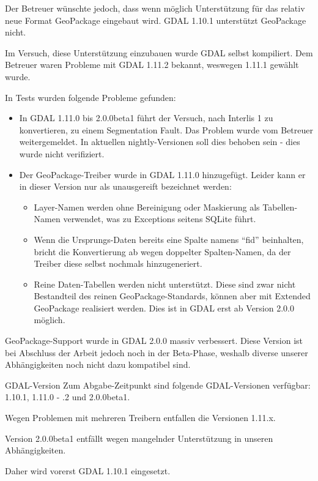 Der Betreuer wünschte jedoch, dass wenn möglich Unterstützung für das relativ neue Format GeoPackage eingebaut wird. GDAL 1.10.1 unterstützt GeoPackage nicht.

Im Versuch, diese Unterstützung einzubauen wurde GDAL selbst kompiliert. Dem Betreuer waren Probleme mit GDAL 1.11.2 bekannt, weswegen 1.11.1 gewählt wurde.

In Tests wurden folgende Probleme gefunden:
\begin{itemize}
\item In GDAL 1.11.0 bis 2.0.0beta1 führt der Versuch, nach Interlis 1 zu konvertieren, zu einem Segmentation Fault. Das Problem wurde vom Betreuer weitergemeldet. In aktuellen nightly-Versionen soll dies behoben sein - dies wurde nicht verifiziert.
\item Der GeoPackage-Treiber wurde in GDAL 1.11.0 hinzugefügt. Leider kann er in dieser Version nur als unausgereift bezeichnet werden:
  \begin{itemize}
  \item Layer-Namen werden ohne Bereinigung oder Maskierung als Tabellen-Namen verwendet, was zu Exceptions seitens SQLite führt.
  \item Wenn die Ursprungs-Daten bereits eine Spalte namens ``fid'' beinhalten, bricht die Konvertierung ab wegen doppelter Spalten-Namen, da der Treiber diese selbst nochmals hinzugeneriert.
  \item Reine Daten-Tabellen werden nicht unterstützt. Diese sind zwar nicht Bestandteil des reinen GeoPackage-Standards, können aber mit Extended GeoPackage realisiert werden. Dies ist in GDAL erst ab Version 2.0.0 möglich.
  \end{itemize}
\end{itemize}

GeoPackage-Support wurde in GDAL 2.0.0 massiv verbessert. Diese Version ist bei Abschluss der Arbeit jedoch noch in der Beta-Phase, weshalb diverse unserer Abhängigkeiten noch nicht dazu kompatibel sind.

\begin{decision}[label=dec:pd:gdal-version]{GDAL-Version}
Zum Abgabe-Zeitpunkt sind folgende GDAL-Versionen verfügbar: 1.10.1, 1.11.0 - .2 und 2.0.0beta1.

Wegen Problemen mit mehreren Treibern entfallen die Versionen 1.11.x.

Version 2.0.0beta1 entfällt wegen mangelnder Unterstützung in unseren Abhängigkeiten.

Daher wird vorerst GDAL 1.10.1 eingesetzt.
\end{decision}

